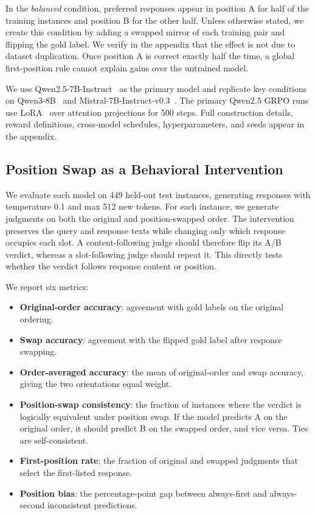 \documentclass[11pt]{article}
\begin{document}
In the \emph{balanced} condition, preferred responses appear in position A for half of the training instances and position B for the other half. Unless otherwise stated, we create this condition by adding a swapped mirror of each training pair and flipping the gold label. We verify in the appendix that the effect is not due to dataset duplication. Once position A is correct exactly half the time, a global first-position rule cannot explain gains over the untrained model.

We use Qwen2.5-7B-Instruct~\citep{qwen2025qwen25} as the primary model and replicate key conditions on Qwen3-8B~\citep{qwen2025qwen3} and Mistral-7B-Instruct-v0.3~\citep{jiang2023mistral}. The primary Qwen2.5 GRPO runs use LoRA~\citep{hu2022lora} over attention projections for 500 steps. Full construction details, reward definitions, cross-model schedules, hyperparameters, and seeds appear in the appendix.

\subsection{Position Swap as a Behavioral Intervention}

We evaluate each model on 449 held-out test instances, generating responses with temperature 0.1 and max 512 new tokens. For each instance, we generate judgments on both the original and position-swapped order. The intervention preserves the query and response texts while changing only which response occupies each slot. A content-following judge should therefore flip its A/B verdict, whereas a slot-following judge should repeat it. This directly tests whether the verdict follows response content or position.

We report six metrics:
\begin{itemize}
\item \textbf{Original-order accuracy}: agreement with gold labels on the original ordering.
\item \textbf{Swap accuracy}: agreement with the flipped gold label after response swapping.
\item \textbf{Order-averaged accuracy}: the mean of original-order and swap accuracy, giving the two orientations equal weight.
\item \textbf{Position-swap consistency}: the fraction of instances where the verdict is logically equivalent under position swap. If the model predicts A on the original order, it should predict B on the swapped order, and vice versa. Ties are self-consistent.
\item \textbf{First-position rate}: the fraction of original and swapped judgments that select the first-listed response.
\item \textbf{Position bias}: the percentage-point gap between always-first and always-second inconsistent predictions.
\end{itemize}
\end{document}
